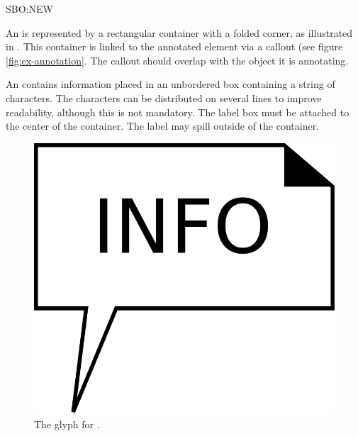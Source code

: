 \begin{glyphDescription}

\glyphSboTerm SBO:NEW

\glyphContainer An  is represented by a rectangular
container with a folded corner, as illustrated in
. This container is linked to the annotated element
via a callout (see figure \ref{fig:ex-annotation}. The callout should
overlap with the object it is annotating.

\glyphLabel An  contains information placed in an unbordered box containing a string of characters.  The characters can be distributed on several lines to improve readability, although this is not mandatory.  The label box must be attached to the center of the container. The label may spill outside of the container. 

\end{glyphDescription}

\begin{figure}[H]
  \centering
  \includegraphics[scale = 0.3]{images/annotation}
  \caption{The \PD glyph for .}
  \label{fig:annotation}
\end{figure}

